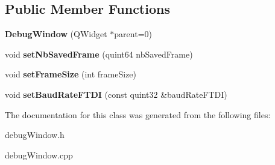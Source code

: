 \subsection*{Public Member Functions}
\begin{DoxyCompactItemize}
\item 
\mbox{\label{class_debug_window_a3d30802f186989ab6d24e970320e3c42}} 
{\bfseries Debug\+Window} (Q\+Widget $\ast$parent=0)
\item 
\mbox{\label{class_debug_window_a0832ddf91cdc920ed5d069360daaf33a}} 
void {\bfseries set\+Nb\+Saved\+Frame} (quint64 nb\+Saved\+Frame)
\item 
\mbox{\label{class_debug_window_a767b6a5c6731281abfa64f6e5e9cb62e}} 
void {\bfseries set\+Frame\+Size} (int frame\+Size)
\item 
\mbox{\label{class_debug_window_a714f2082c0d9fceed30697a263c5154c}} 
void {\bfseries set\+Baud\+Rate\+F\+T\+DI} (const quint32 \&baud\+Rate\+F\+T\+DI)
\end{DoxyCompactItemize}


The documentation for this class was generated from the following files\+:\begin{DoxyCompactItemize}
\item 
debug\+Window.\+h\item 
debug\+Window.\+cpp\end{DoxyCompactItemize}
